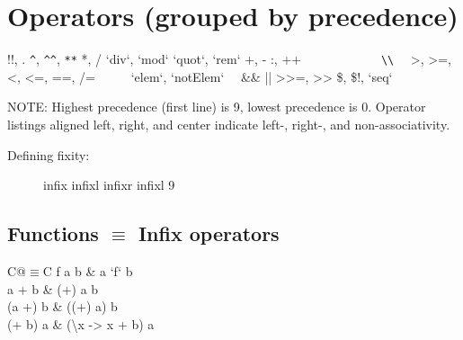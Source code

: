 \documentclass{refcard}
\newcommand{\la}{\textbackslash}
\begin{document}
\section{Operators (grouped by precedence)}

\begin{Ldesc}
	 !!, \hfill .
	 \hfill \verb+^+, \verb+^^+, \verb+**+
	 *, /
	 `div`, `mod`
	 `quot`, `rem`
	 +, -
	 \hfill :, ++
	                 ~~~~~~~~~~~~\verb+\\+
	\Li[comparisons:]     ~~>, >=, <, <=, ==, /=~~
	  ~~~`elem`, `notElem`~~
	 \hfill \&\&
	\Li[boolean or] \hfill ||
	 >{>}=, >{>}
	 \$, \$!, `seq`
\end{Ldesc}

\noindent
NOTE: Highest precedence (first line) is 9, lowest precedence is 0.  Operator
listings aligned left, right, and center indicate left-, right-, and
non-associativity.

\begin{description}
\item [Defining fixity:]
\begin{ldesc}
	 infix  
	 infixl  \I{+-+}
	 infixr  \I{-!-}
	 infixl 9
\end{ldesc}
\end{description}

\subsection{Functions $\equiv$ Infix operators}

\begin{tabular}{C@{\s$\equiv$\s}C}
	f a b & a `f` b \\
	a + b & (+) a b \\
	(a +) b & ((+) a) b \\
	(+ b) a & (\la{}x -> x + b) a \\
\end{tabular}
\end{document}
